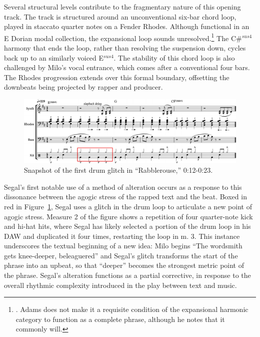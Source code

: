 Several structural levels contribute to the fragmentary nature of this opening track. The track is 
structured around an unconventional six-bar chord loop, played in staccato quarter notes on a Fender
Rhodes. Although functional in an E Dorian modal collection, the expansional loop sounds
unresolved.\footnote{\cite{kyleadamsHarmonicSyntacticMotivic2020}. Adams does not make it a 
requisite condition of the expansional harmonic category to function as a complete phrase, although 
he notes that it commonly will.} The C\#$^{sus4}$ harmony that ends the loop, rather than resolving 
the suspension down, cycles back up to an similarly voiced E$^{sus4}$. The stability of this chord 
loop is also challenged by Milo's vocal entrance, which comes after a conventional four bars. The 
Rhodes progression extends over this formal boundary, offsetting the downbeats being projected by 
rapper and producer.

    \begin{figure}[ht]
        \centering
        \includegraphics[width=\textwidth]{images/figures/chp 02/012023rabblefirstglitch.pdf}
        \caption{Snapshot of the first drum glitch in ``Rabblerouse,'' 0:12-0:23.}
        \label{fig:rabblefirstglitch}
    \end{figure}

Segal's first notable use of a method of alteration occurs as a response to this dissonance between
the agogic stress of the rapped text and the beat. Boxed in red in Figure~\ref{fig:rabblefirstglitch}, 
Segal uses a glitch in the drum loop to articulate a new point of agogic stress. Measure 2 of the 
figure shows a repetition of four quarter-note kick and hi-hat hits, where Segal has likely selected 
a portion of the drum loop in his DAW and duplicated it four times, restarting the loop in m. 3. This
instance underscores the textual beginning of a new idea: Milo begins ``The wordsmith gets knee-deeper,
beleaguered'' and Segal's glitch transforms the start of the phrase into an upbeat, so that ``deeper''
becomes the strongest metric point of the phrase. Segal's alteration functions as a partial corrective, 
in response to the overall rhythmic complexity introduced in the play between text and music.

